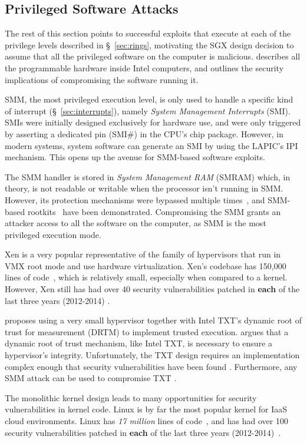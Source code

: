 \subsection{Privileged Software Attacks}
\label{sec:system_software_attacks}

The rest of this section points to successful exploits that execute at each of
the privilege levels described in \S~\ref{sec:rings}, motivating the SGX design
decision to assume that all the privileged software on the computer is
malicious. \cite{rutkowska2015intelsux} describes all the programmable hardware
inside Intel computers, and outlines the security implications of compromising
the software running it.

SMM, the most privileged execution level, is only used to handle a specific
kind of interrupt (\S~\ref{sec:interrupts}), namely
\textit{System Management Interrupts} (SMI). SMIs were initially designed
exclusively for hardware use, and were only triggered by asserting a dedicated
pin (SMI\#) in the CPU's chip package. However, in modern systems, system
software can generate an SMI by using the LAPIC's IPI mechanism. This opens up
the avenue for SMM-based software exploits.

The SMM handler is stored in  \textit{System Management RAM} (SMRAM) which, in
theory, is not readable or writable when the processor isn't running in SMM.
However, its protection mechanisms were bypassed multiple
times~\cite{duflot2006smm, rutkowska2008remap, wojtczuk2009smm,
kallenberg2014smm}, and SMM-based rootkits~\cite{wecherowski2009smm,
embleton2010smm} have been demonstrated. Compromising the SMM grants an
attacker access to all the software on the computer, as SMM is the most
privileged execution mode.

Xen \cite{zhang2008xen} is a very popular representative of the family of
hypervisors that run in VMX root mode and use hardware virtualization. Xen's
codebase has 150,000 lines of code~\cite{xen2015loc}, which is relatively
small, especially when compared to a kernel. However, Xen still has had over 40
security vulnerabilities patched in \textbf{each} of the last three years
(2012-2014) \cite{cvedetails2014xen}.

\cite{mccune2010trustvisor} proposes using a very small hypervisor together
with Intel TXT's dynamic root of trust for measurement (DRTM) to implement
trusted execution. \cite{vasudevan2010requirements} argues that a dynamic root
of trust mechanism, like Intel TXT, is necessary to ensure a hypervisor's
integrity.  Unfortunately, the TXT design requires an implementation complex
enough that security vulnerabilities have been found \cite{wojtczuk2009txt2}
\cite{wojtczuk2011txt}. Furthermore, any SMM attack can be used to compromise
TXT \cite{wojtczuk2009txt}.

The monolithic kernel design leads to many opportunities for security
vulnerabilities in kernel code. Linux is by far the most popular kernel for
IaaS cloud environments. Linux has \emph{17 million} lines of
code~\cite{anthony2014linuxsize}, and  has had over 100 security
vulnerabilities patched in \textbf{each} of the last three years
(2012-2014)~\cite{cvedetails2014linux, chen2011linux}.

